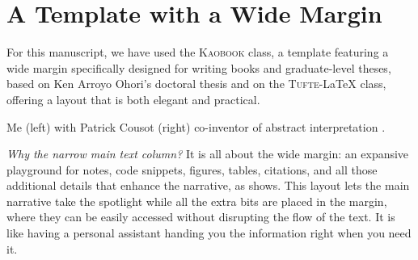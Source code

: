 \def\customcitkey{}\def\absintkey{}


\chapter*{A Template with a Wide Margin}

For this manuscript, we have used the \textsc{Kaobook} class, a template featuring a wide margin specifically designed for writing books and graduate-level theses, based on Ken Arroyo Ohori's doctoral thesis and on the \textsc{Tufte}-\LaTeX{} class, offering a layout that is both elegant and practical.

\newcommand*{\ClipSep}{0.5cm}
\begin{marginfigure}
  \centering
  \hspace*{-\ClipSep}
    \vspace*{-\ClipSep}
  \caption{Me (left) with Patrick Cousot (right) co-inventor of abstract interpretation \cite{\absintkey}.}
\end{marginfigure}

\marginnote{\formatmargincitation{\absintkey}}

\emph{Why the narrow main text column?} It is all about the wide margin: an expansive playground for notes, code snippets, figures, tables, citations, and all those additional details that enhance the narrative, as  shows.
This layout lets the main narrative take the spotlight while all the extra bits are placed in the margin, where they can be easily accessed without disrupting the flow of the text. It is like having a personal assistant handing you the information right when you need it.

